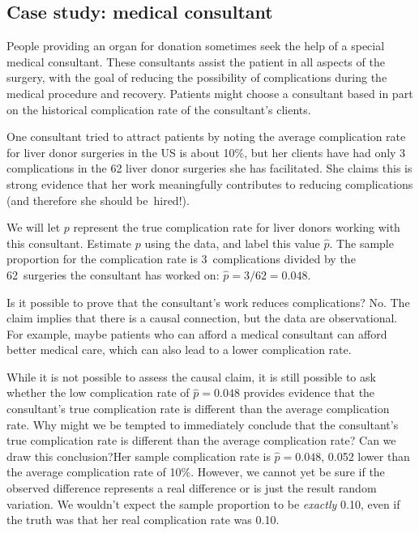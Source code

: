 \subsection{Case study: medical consultant}

People providing an organ for donation sometimes seek the help of a special medical consultant. These consultants assist the patient in all aspects of the surgery, with the goal of reducing the possibility of complications during the medical procedure and recovery. Patients might choose a consultant based in part on the historical complication rate of the consultant's clients.

One consultant tried to attract patients by noting the average complication rate for liver donor surgeries in the US is about 10\%, but her clients have had only 3 complications in the 62 liver donor surgeries she has facilitated. She claims this is strong evidence that her work meaningfully contributes to reducing complications (and therefore she should be~hired!).

\begin{example}{We will let $p$ represent the true complication rate for liver donors working with this consultant. Estimate $p$ using the data, and label this value $\hat{p}$.}
The sample proportion for the complication rate is 3~complications divided by the 62~surgeries the consultant has worked on: $\hat{p} = 3/62 = 0.048$.
\end{example}

\begin{example}{Is it possible to prove that the consultant's work reduces complications?}
No. The claim implies that there is a causal connection, but the data are observational. For example, maybe patients who can afford a medical consultant can afford better medical care, which can also lead to a lower complication rate.
\end{example}

\begin{example}{
While it is not possible to assess the causal claim, it is still possible to ask whether the low complication rate of $\hat{p} = 0.048$ provides evidence that the consultant's true complication rate is different than the average complication rate.  Why might we be tempted to immediately conclude that the consultant's true complication rate is different than the average complication rate?  Can we draw this conclusion?}Her sample complication rate is $\hat{p} = 0.048$, 0.052 lower than the average complication rate of 10\%.  However, we cannot yet be sure if the observed difference represents a real difference or is just the result random variation.  We wouldn't expect the sample proportion to be \emph{exactly} 0.10, even if the truth was that her real complication rate was 0.10.
\end{example}



